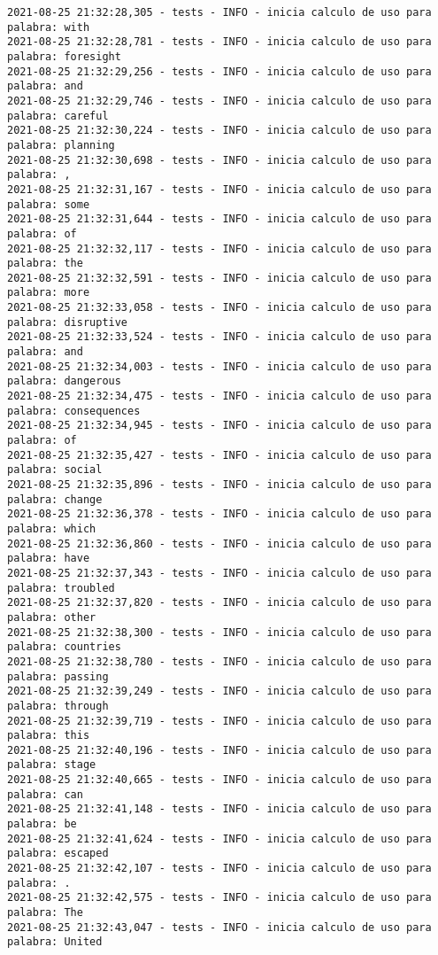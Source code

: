 \documentclass[11pt]{article}
\begin{document}
\begin{verbatim}
2021-08-25 21:32:28,305 - tests - INFO - inicia calculo de uso para palabra: with
2021-08-25 21:32:28,781 - tests - INFO - inicia calculo de uso para palabra: foresight
2021-08-25 21:32:29,256 - tests - INFO - inicia calculo de uso para palabra: and
2021-08-25 21:32:29,746 - tests - INFO - inicia calculo de uso para palabra: careful
2021-08-25 21:32:30,224 - tests - INFO - inicia calculo de uso para palabra: planning
2021-08-25 21:32:30,698 - tests - INFO - inicia calculo de uso para palabra: ,
2021-08-25 21:32:31,167 - tests - INFO - inicia calculo de uso para palabra: some
2021-08-25 21:32:31,644 - tests - INFO - inicia calculo de uso para palabra: of
2021-08-25 21:32:32,117 - tests - INFO - inicia calculo de uso para palabra: the
2021-08-25 21:32:32,591 - tests - INFO - inicia calculo de uso para palabra: more
2021-08-25 21:32:33,058 - tests - INFO - inicia calculo de uso para palabra: disruptive
2021-08-25 21:32:33,524 - tests - INFO - inicia calculo de uso para palabra: and
2021-08-25 21:32:34,003 - tests - INFO - inicia calculo de uso para palabra: dangerous
2021-08-25 21:32:34,475 - tests - INFO - inicia calculo de uso para palabra: consequences
2021-08-25 21:32:34,945 - tests - INFO - inicia calculo de uso para palabra: of
2021-08-25 21:32:35,427 - tests - INFO - inicia calculo de uso para palabra: social
2021-08-25 21:32:35,896 - tests - INFO - inicia calculo de uso para palabra: change
2021-08-25 21:32:36,378 - tests - INFO - inicia calculo de uso para palabra: which
2021-08-25 21:32:36,860 - tests - INFO - inicia calculo de uso para palabra: have
2021-08-25 21:32:37,343 - tests - INFO - inicia calculo de uso para palabra: troubled
2021-08-25 21:32:37,820 - tests - INFO - inicia calculo de uso para palabra: other
2021-08-25 21:32:38,300 - tests - INFO - inicia calculo de uso para palabra: countries
2021-08-25 21:32:38,780 - tests - INFO - inicia calculo de uso para palabra: passing
2021-08-25 21:32:39,249 - tests - INFO - inicia calculo de uso para palabra: through
2021-08-25 21:32:39,719 - tests - INFO - inicia calculo de uso para palabra: this
2021-08-25 21:32:40,196 - tests - INFO - inicia calculo de uso para palabra: stage
2021-08-25 21:32:40,665 - tests - INFO - inicia calculo de uso para palabra: can
2021-08-25 21:32:41,148 - tests - INFO - inicia calculo de uso para palabra: be
2021-08-25 21:32:41,624 - tests - INFO - inicia calculo de uso para palabra: escaped
2021-08-25 21:32:42,107 - tests - INFO - inicia calculo de uso para palabra: .
2021-08-25 21:32:42,575 - tests - INFO - inicia calculo de uso para palabra: The
2021-08-25 21:32:43,047 - tests - INFO - inicia calculo de uso para palabra: United

\end{verbatim}
\end{document}
